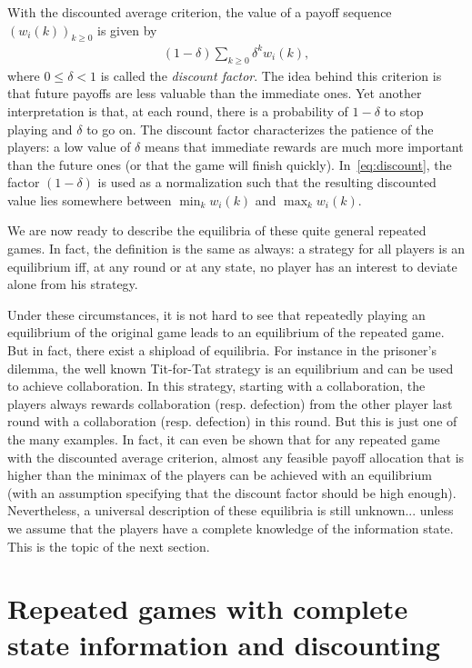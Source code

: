 With the discounted average criterion, the value of a payoff sequence $(w_i(k))_{k \geq 0}$ is given by 
\begin{align} \label{eq:discount}
	(1-\delta) \sum_{k \geq 0} \delta^k w_i(k),
\end{align}
where $0 \leq \delta < 1$ is called the \emph{discount factor}. The idea behind this criterion is that future payoffs are less valuable than the immediate ones. Yet another interpretation is that, at each round, there is a probability of $1-\delta$ to stop playing and $\delta$ to go on. The discount factor characterizes the patience of the players: a low value of $\delta$ means that immediate rewards are much more important than the future ones (or that the game will finish quickly). In~\eqref{eq:discount}, the factor $(1-\delta)$ is used as a normalization such that the resulting discounted value lies somewhere between $\min_k w_i(k)$ and $\max_k w_i(k)$.

We are now ready to describe the equilibria of these quite general repeated games. In fact, the definition is the same as always: a strategy for all players is an equilibrium iff, at any round or at any state, no player has an interest to deviate alone from his strategy. 

Under these circumstances, it is not hard to see that repeatedly playing an equilibrium of the original game leads to an equilibrium of the repeated game. But in fact, there exist a shipload of equilibria. For instance in the prisoner's dilemma, the well known Tit-for-Tat strategy is an equilibrium and can be used to achieve collaboration. In this strategy, starting with a collaboration, the players always rewards collaboration (resp. defection) from the other player last round with a collaboration (resp. defection) in this round. But this is just one of the many examples. In fact, it can even be shown that for any repeated game with the discounted average criterion, almost any feasible payoff allocation that is higher than the minimax of the players can be achieved with an equilibrium (with an assumption specifying that the discount factor should be high enough). Nevertheless, a universal description of these equilibria is still unknown... unless we assume that the players have a complete knowledge of the information state. This is the topic of the next section.



\section{Repeated games with complete state information and discounting}



